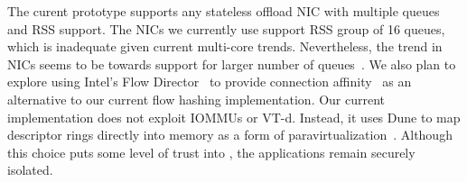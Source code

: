 

 The curent prototype
supports any stateless offload NIC with multiple queues and RSS
support. The NICs we currently use support RSS group of 16 queues,
which is inadequate given current multi-core trends. Nevertheless, the
trend in NICs seems to be towards support for larger number of
queues~\cite{radhakrishnan2014senic}. We also plan to explore using Intel's Flow
Director~\cite{intel:82599} to provide connection
affinity~\cite{DBLP:conf/eurosys/PesterevSZM12} as an alternative to
our current flow hashing implementation. Our current implementation
does not exploit IOMMUs or VT-d. Instead, it uses Dune to map
descriptor rings directly into \ix memory as a form of
paravirtualization~\cite{DBLP:conf/sosp/BarhamDFHHHN03}.  Although
this choice puts some level of trust into \ix, the applications remain
securely isolated. %

